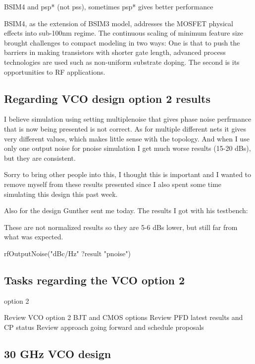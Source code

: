 \documentclass{article}
\begin{document}
BSIM4 and psp* (not pss), sometimes psp* gives better performance

BSIM4, as the extension of BSIM3 model, addresses the MOSFET physical effects into sub-100nm regime. The continuous scaling of minimum feature size brought challenges to compact modeling in two ways: One is that to push the barriers in making transistors with shorter gate length, advanced process technologies are used such as non-uniform substrate doping. The second is its opportunities to RF applications.


\subsection{Regarding VCO design option 2 results}


I believe simulation using setting multiplenoise that gives phase noise perfrmance that is now being presented is not correct.
As for multiple different nets it gives very different values, which makes little sense with the topology.
And when I use only one output noise for pnoise simulation I get much worse results (15-20 dBs), but they are consistent.

Sorry to bring other people into this, I thought this is important and I wanted to remove myself from these results presented since I also spent some time simulating this design this past week.

Also for the design Gunther sent me today. The results I got with his testbench:

These are not normalized results so they are 5-6 dBs lower, but still far from what was expected.

rfOutputNoise("dBc/Hz" ?result "pnoise")


\subsection{Tasks regarding the VCO option 2}

option 2

Review VCO option 2 BJT and CMOS options
Review PFD latest results and CP status
Review approach going forward and schedule proposals


\subsection{30 GHz VCO design}
\end{document}
